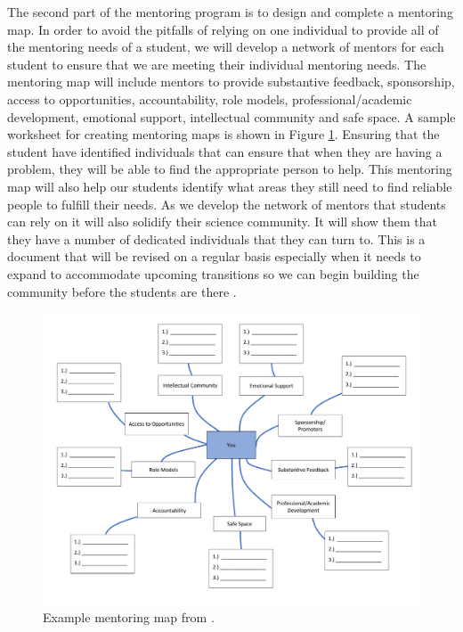 \documentclass[12pt]{article}
\begin{document}
The second part of the mentoring program is to design and complete a mentoring map. In order to avoid the pitfalls of relying on one individual to provide all of the mentoring needs of a student, we will develop a network of mentors for each student to ensure that we are meeting their individual mentoring needs.  The mentoring map will include mentors to provide substantive feedback, sponsorship, access to opportunities, accountability, role models, professional/academic development, emotional support, intellectual community and safe space. A sample worksheet for creating mentoring maps is shown in Figure \ref{fig:map}.  Ensuring that the student have identified individuals that can ensure that when they are having a problem, they will be able to find the appropriate person to help. This mentoring map will also help our students identify what areas they still need to find reliable people to fulfill their needs.  As we develop the network of mentors that students can rely on it will also solidify their science community. It will show them that they have a number of dedicated individuals that they can turn to.  This is a document that will be revised on a regular basis especially when it needs to expand to accommodate upcoming transitions so we can begin building the community before the students are there \citep{NAP25568}. 

\begin{figure}
    \centering
    \includegraphics[width=6in]{mentoringmap.pdf}
    \caption{Example mentoring map from \citet{Bosch}.
    \label{fig:map}}
    \vspace{-5mm}
\end{figure}
\end{document}
